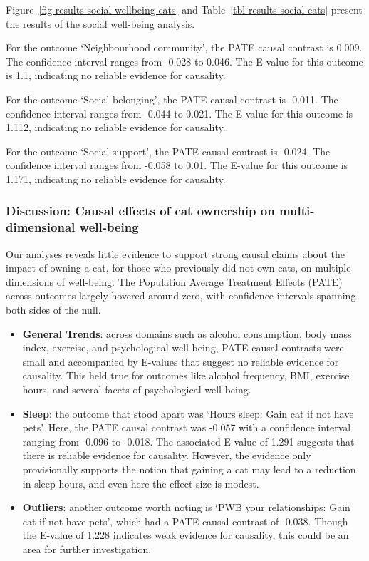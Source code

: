 \documentclass[
  singlecolumn,
  9pt]{article}
\begin{document}
Figure~\ref{fig-results-social-wellbeing-cats} and
Table~\ref{tbl-results-social-cats} present the results of the social
well-being analysis.

For the outcome `Neighbourhood community', the PATE causal contrast is
0.009. The confidence interval ranges from -0.028 to 0.046. The E-value
for this outcome is 1.1, indicating no reliable evidence for causality.

For the outcome `Social belonging', the PATE causal contrast is -0.011.
The confidence interval ranges from -0.044 to 0.021. The E-value for
this outcome is 1.112, indicating no reliable evidence for causality..

For the outcome `Social support', the PATE causal contrast is -0.024.
The confidence interval ranges from -0.058 to 0.01. The E-value for this
outcome is 1.171, indicating no reliable evidence for causality.

\subsubsection{Discussion: Causal effects of cat ownership on
multi-dimensional
well-being}\label{discussion-causal-effects-of-cat-ownership-on-multi-dimensional-well-being}

Our analyses reveals little evidence to support strong causal claims
about the impact of owning a cat, for those who previously did not own
cats, on multiple dimensions of well-being. The Population Average
Treatment Effects (PATE) across outcomes largely hovered around zero,
with confidence intervals spanning both sides of the null.

\begin{itemize}
\item
  \textbf{General Trends}: across domains such as alcohol consumption,
  body mass index, exercise, and psychological well-being, PATE causal
  contrasts were small and accompanied by E-values that suggest no
  reliable evidence for causality. This held true for outcomes like
  alcohol frequency, BMI, exercise hours, and several facets of
  psychological well-being.
\item
  \textbf{Sleep}: the outcome that stood apart was `Hours sleep: Gain
  cat if not have pets'. Here, the PATE causal contrast was -0.057 with
  a confidence interval ranging from -0.096 to -0.018. The associated
  E-value of 1.291 suggests that there is reliable evidence for
  causality. However, the evidence only provisionally supports the
  notion that gaining a cat may lead to a reduction in sleep hours, and
  even here the effect size is modest.
\item
  \textbf{Outliers}: another outcome worth noting is `PWB your
  relationships: Gain cat if not have pets', which had a PATE causal
  contrast of -0.038. Though the E-value of 1.228 indicates weak
  evidence for causality, this could be an area for further
  investigation.
\end{itemize}
\end{document}
